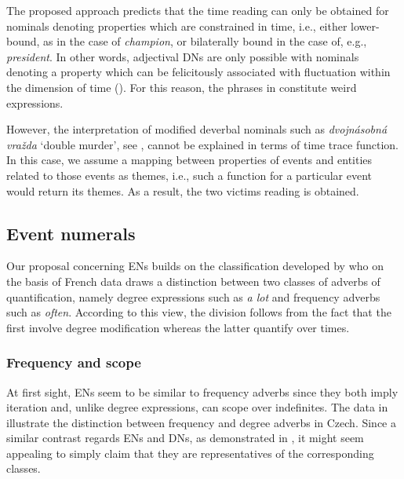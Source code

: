 \documentclass[output=paper,
modfonts,
hidelinks,
newtxmath
]{langscibook}
\begin{document}
The proposed approach predicts that the time reading can only be obtained for nominals denoting properties which are constrained in time, i.e., either lower-bound, as in the case of \textit{champion}, or bilaterally bound in the case of, e.g., \textit{president}. In other words, adjectival DNs are only possible with nominals denoting a property which can be felicitously associated with fluctuation within the dimension of time (\citealt{wagiel2015multiplicative}). For this reason, the phrases in  constitute weird expressions.

\z

\noindent However, the interpretation of modified deverbal nominals such as \textit{dvojnásobná vražda} `double murder', see , cannot be explained in terms of time trace function. In this case, we assume a mapping between properties of events and entities related to those events as themes, i.e., such a function for a particular event would return its themes. As a result, the two victims reading is obtained.

\subsection{Event numerals}\label{event-numerals}

Our proposal concerning ENs builds on the classification developed by \cite{doetjes_adverbs_2007} who on the basis of French data draws a distinction between two classes of adverbs of quantification, namely degree expressions such as \textit{a lot} and frequency adverbs such as \textit{often}. According to this view, the division follows from the fact that the first involve degree modification whereas the latter quantify over times. 

\subsubsection{Frequency and scope}\label{frequency-and-scope}

At first sight, ENs seem to be similar to frequency adverbs since they both imply iteration and, unlike degree expressions, can scope over indefinites. The data in  illustrate the distinction between frequency and degree adverbs in Czech. Since a similar contrast regards ENs and DNs, as demonstrated in , it might seem appealing to simply claim that they are representatives of the corresponding classes.
\end{document}
